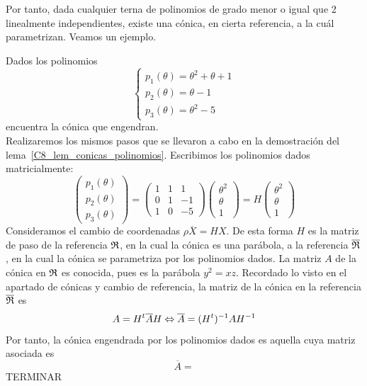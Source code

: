 Por tanto, dada cualquier terna de polinomios de grado menor o igual que 2 linealmente independientes, existe una cónica, en cierta referencia, a la cuál parametrizan. Veamos un ejemplo.
\begin{exa}
 	Dados los polinomios 
 	\[\begin{cases}
 		p_1(\theta)=\theta^2+\theta+1\\
 		p_2(\theta)=\theta-1\\
 		p_3(\theta)=\theta^2-5
 	\end{cases}\]
 	encuentra la cónica que engendran.\\
 	
 	Realizaremos los mismos pasos que se llevaron a cabo en la demostración del lema~\ref{C8_lem_conicas_polinomios}. Escribimos los polinomios dados matricialmente:
 	\begin{equation*}
 		\left( \begin{array}{c}
 			p_1(\theta)\\p_2(\theta)\\p_3(\theta)
 		\end{array}\right)=
 		\left( \begin{array}{ccc}
 			1&1&1\\
 			0&1&-1\\
 			1&0&-5
 		\end{array}\right) 
 		\left( \begin{array}{c}
 			\theta^2\\\theta\\1
 		\end{array}\right)=H
 		\left( \begin{array}{c}
 			\theta^2\\\theta\\1
 		\end{array}\right)
 	\end{equation*}
 	Consideramos el cambio de coordenadas $\rho \overline{X}=HX$. De esta forma $H$ es la matriz de paso de la referencia $\mathfrak{R}$, en la cual la cónica es una parábola, a la referencia $\overline{\mathfrak{R}}$, en la cual la cónica se parametriza por los polinomios dados. La matriz $A$ de la cónica en $\mathfrak{R}$ es conocida, pues es la parábola $y^2=xz$. Recordado lo visto en el apartado de cónicas y cambio de referencia, la matriz de la cónica en la referencia $\overline{\mathfrak{R}}$ es
 	\begin{equation}
	 	A=H^t\overline{A}H\Leftrightarrow \overline{A}=(H^t)^{-1}AH^{-1}
 	\end{equation}
 	Por tanto, la cónica engendrada por los polinomios dados es aquella cuya matriz asociada es
 	\begin{equation*}
	 	\overline{A}=
 	\end{equation*}
 	TERMINAR
\end{exa}
